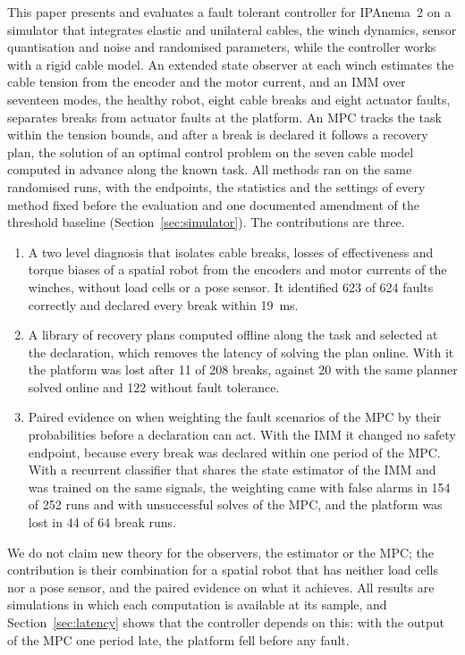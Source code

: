 \documentclass{interact}
\begin{document}
This paper presents and evaluates a fault tolerant controller for IPAnema~2 on a simulator that integrates elastic and unilateral cables, the winch dynamics, sensor quantisation and noise and randomised parameters, while the controller works with a rigid cable model. An extended state observer at each winch estimates the cable tension from the encoder and the motor current, and an IMM over seventeen modes, the healthy robot, eight cable breaks and eight actuator faults, separates breaks from actuator faults at the platform. An MPC tracks the task within the tension bounds, and after a break is declared it follows a recovery plan, the solution of an optimal control problem on the seven cable model computed in advance along the known task. All methods ran on the same randomised runs, with the endpoints, the statistics and the settings of every method fixed before the evaluation and one documented amendment of the threshold baseline (Section~\ref{sec:simulator}). The contributions are three.
\begin{enumerate}
\item A two level diagnosis that isolates cable breaks, losses of effectiveness and torque biases of a spatial robot from the encoders and motor currents of the winches, without load cells or a pose sensor. It identified 623 of 624 faults correctly and declared every break within 19~ms.
\item A library of recovery plans computed offline along the task and selected at the declaration, which removes the latency of solving the plan online. With it the platform was lost after 11 of 208 breaks, against 20 with the same planner solved online and 122 without fault tolerance.
\item Paired evidence on when weighting the fault scenarios of the MPC by their probabilities before a declaration can act. With the IMM it changed no safety endpoint, because every break was declared within one period of the MPC. With a recurrent classifier that shares the state estimator of the IMM and was trained on the same signals, the weighting came with false alarms in 154 of 252 runs and with unsuccessful solves of the MPC, and the platform was lost in 44 of 64 break runs.
\end{enumerate}
We do not claim new theory for the observers, the estimator or the MPC; the contribution is their combination for a spatial robot that has neither load cells nor a pose sensor, and the paired evidence on what it achieves. All results are simulations in which each computation is available at its sample, and Section~\ref{sec:latency} shows that the controller depends on this: with the output of the MPC one period late, the platform fell before any fault.
\end{document}
